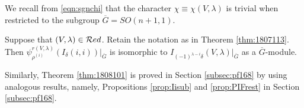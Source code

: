 We recall from \eqref{eqn:sgnchi}
 that the character 
$\chi \equiv \chi(V,\lambda)$
 is trivial 
 when restricted to the subgroup $\overline G=SO(n+1,1)$.  

\begin{proposition}
\label{prop:transrest}
Suppose that $(V,\lambda)\in {\mathcal{R}}ed$.  
Retain the notation as in Theorem \ref{thm:1807113}.  
Then $\psi_{\rho^{(i)}}^{r(V,\lambda)}(I_{\delta}(i,i))|_{\overline G}$
 is isomorphic to 
 $I_{(-1)^{\lambda-i}\delta}(V,\lambda)|_{\overline G}$
 as a $\overline G$-module.  
\end{proposition}



Similarly, 
 Theorem \ref{thm:1808101} is proved 
in Section \ref{subsec:pf168}
 by using analogous results, 
 namely,
 Propositions \ref{prop:Iisub} and \ref{prop:PIFrest}
 in Section \ref{subsec:pf168}.  



